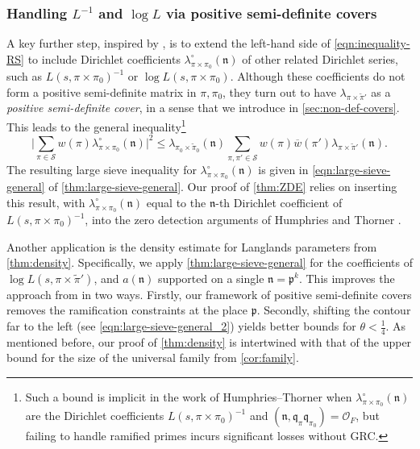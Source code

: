 \documentclass[11pt]{amsart}
\theoremstyle{remark}
\numberwithin{equation}{section}
\newcommand{\p}{\mathfrak{p}}
\newcommand{\n}{\mathfrak{n}}
\newcommand{\kn}{\mathfrak{n}}
\newcommand{\kq}{\mathfrak{q}}
\newcommand{\mO}{\mathcal{O}}
\newcommand{\mS}{\mathcal{S}}
\renewcommand{\bar}{\overline}
\renewcommand{\tilde}{\widetilde}
\begin{document}
\subsubsection{Handling $L^{-1}$ and $\log L$ via positive semi-definite covers}
A key further step, inspired by \cite{humphries2024zeros}, is to extend the left-hand side of \cref{eqn:inequality-RS} to include Dirichlet coefficients $\lambda^\circ_{\pi \times \pi_0}(\n)$ of other related Dirichlet series, such as $L(s, \pi \times \pi_0)^{-1}$ or $\log L(s, \pi \times \pi_0)$. Although these coefficients do not form a positive semi-definite matrix in $\pi, \pi_0$, they turn out to have $\lambda_{\pi \times \tilde\pi'}$ as a \emph{positive semi-definite cover}, in a sense that we introduce in \cref{sec:non-def-covers}. This leads to the general inequality\footnote{Such a bound is implicit in the work of Humphries--Thorner \cite{humphries2024zeros} when $\lambda^\circ_{\pi \times \pi_0}(\kn)$ are the Dirichlet coefficients $L(s, \pi \times \pi_0)^{-1}$ and $(\kn, \kq_\pi \kq_{\pi_0}) = \mO_F$, but failing to handle ramified primes incurs significant losses without GRC.}
\begin{equation} \label{eqn:inequality-RS-covers}
    \Bigg| \sum_{\pi \in \mS} w(\pi) \lambda^\circ_{\pi \times \pi_0}(\n) \Bigg|^2
    \le 
    \lambda_{\pi_0 \times \tilde\pi_0}(\n) \sum_{\pi, \pi' \in \mS} w(\pi) \bar w(\pi') \lambda_{\pi \times \tilde\pi'}(\n).
\end{equation}
The resulting large sieve inequality for $\lambda^\circ_{\pi \times \pi_0}(\n)$ is given in \eqref{eqn:large-sieve-general} of \cref{thm:large-sieve-general}. Our proof of \cref{thm:ZDE} relies on inserting this result, with $\lambda^{\circ}_{\pi\times\pi_0}(\kn)$ equal to the $\kn$-th Dirichlet coefficient of $L(s,\pi\times\pi_0)^{-1}$, into the zero detection arguments of Humphries and Thorner \cite[Section 5]{humphries2024zeros}.

Another application is the density estimate for Langlands parameters from \cref{thm:density}. Specifically, we apply \cref{thm:large-sieve-general} for the coefficients of $\log L(s, \pi \times \tilde\pi')$, and $a(\n)$ supported on a single $\n = \p^k$. This improves the approach from \cite{lichtman2024density} in two ways. Firstly, our framework of positive semi-definite covers removes the ramification constraints at the place $\p$.  Secondly, shifting the contour far to the left (see \cref{eqn:large-sieve-general_2}) yields better bounds for $\theta < \tfrac{1}{4}$. As mentioned before, our proof of \cref{thm:density} is intertwined with that of the upper bound for the size of the universal family from \cref{cor:family}.
\end{document}
